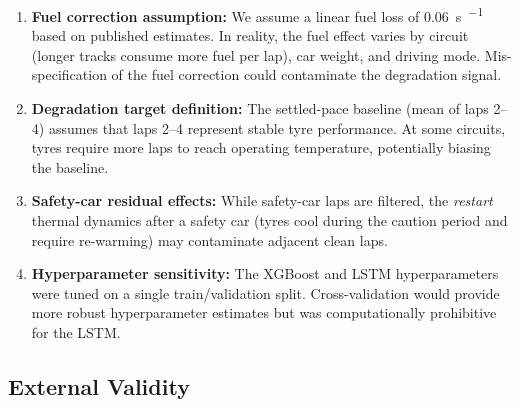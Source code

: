 \documentclass[journal,twoside]{IEEEtran}
\begin{document}
\begin{enumerate}
  \item \textbf{Fuel correction assumption:}  We assume a linear fuel
  loss of \SI{0.06}{\second\per{}} based on published
  estimates.  In reality, the fuel effect varies by circuit (longer
  tracks consume more fuel per lap), car weight, and driving mode.
  Mis-specification of the fuel correction could contaminate the
  degradation signal.

  \item \textbf{Degradation target definition:}  The settled-pace
  baseline (mean of laps 2--4) assumes that laps 2--4 represent stable
  tyre performance.  At some circuits, tyres require more laps to reach
  operating temperature, potentially biasing the baseline.

  \item \textbf{Safety-car residual effects:}  While safety-car laps
  are filtered, the \emph{restart} thermal dynamics after a safety car
  (tyres cool during the caution period and require re-warming) may
  contaminate adjacent clean laps.

  \item \textbf{Hyperparameter sensitivity:}  The XGBoost and LSTM
  hyperparameters were tuned on a single train/validation split.
  Cross-validation would provide more robust hyperparameter estimates
  but was computationally prohibitive for the LSTM.
\end{enumerate}

\subsection{External Validity}
\end{document}

